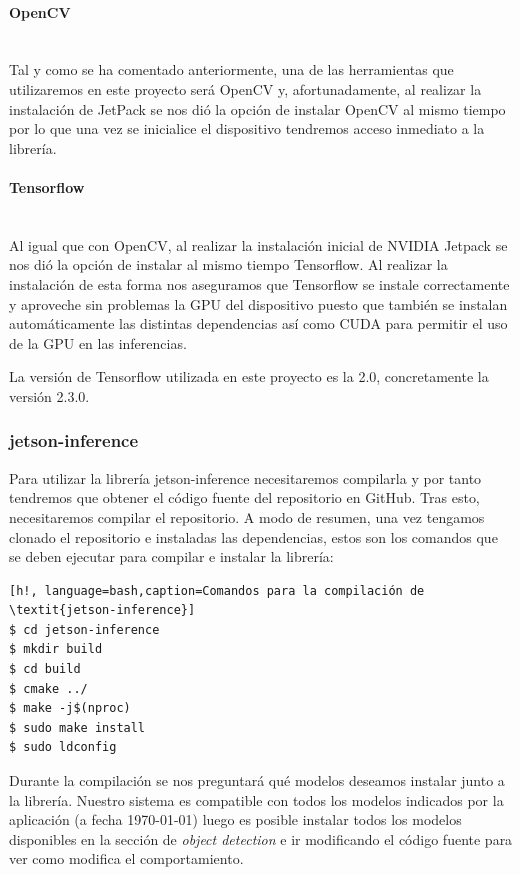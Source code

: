 \paragraph{OpenCV}\mbox{}\\
Tal y como se ha comentado anteriormente, una de las herramientas que utilizaremos en este proyecto será OpenCV y, afortunadamente, al realizar la instalación de JetPack se nos dió la opción de instalar OpenCV al mismo tiempo por lo que una vez se inicialice el dispositivo tendremos acceso inmediato a la librería.

\paragraph{Tensorflow}\mbox{}\\
Al igual que con OpenCV, al realizar la instalación inicial de NVIDIA Jetpack se nos dió la opción de instalar al mismo tiempo Tensorflow.
Al realizar la instalación de esta forma nos aseguramos que Tensorflow se instale correctamente y aproveche sin problemas la GPU del dispositivo puesto que también se instalan automáticamente las distintas dependencias así como CUDA para permitir el uso de la GPU en las inferencias.

La versión de Tensorflow utilizada en este proyecto es la 2.0, concretamente la versión 2.3.0.


\subsubsection{jetson-inference}\label{sec:jetsonInference}

Para utilizar la librería jetson-inference necesitaremos compilarla y por tanto tendremos que obtener el código fuente del repositorio en GitHub\cite{jetsoninferencegithub}.
Tras esto, necesitaremos compilar el repositorio. A modo de resumen, una vez tengamos clonado el repositorio e instaladas las dependencias, estos son los comandos que se deben ejecutar para compilar e instalar la librería:

\begin{lstlisting}[h!, language=bash,caption=Comandos para la compilación de \textit{jetson-inference}]
$ cd jetson-inference
$ mkdir build
$ cd build
$ cmake ../
$ make -j$(nproc)
$ sudo make install
$ sudo ldconfig
\end{lstlisting}

Durante la compilación se nos preguntará qué modelos deseamos instalar junto a la librería. Nuestro sistema es compatible con todos los modelos indicados por la aplicación (a fecha \today) luego es posible instalar todos los modelos disponibles en la sección de \textit{object detection} e ir modificando el código fuente para ver como modifica el comportamiento.


